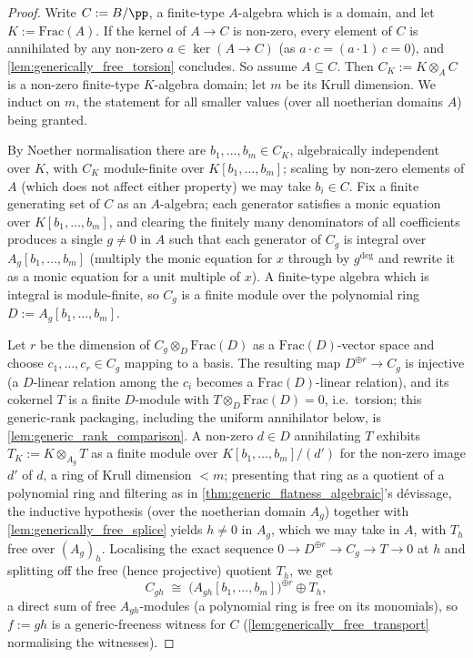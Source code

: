 \begin{proof}
\leanok
  Write \(C := B/\pp\), a finite-type \(A\)-algebra which is a domain, and let
  \(K := \mathrm{Frac}(A)\).  If the kernel of \(A \to C\) is non-zero, every
  element of \(C\) is annihilated by any non-zero \(a \in \ker(A \to C)\)
  (as \(a \cdot c = (a \cdot 1)\, c = 0\)), and
  \cref{lem:generically_free_torsion} concludes.  So assume \(A \subseteq C\).
  Then \(C_K := K \otimes_A C\) is a non-zero finite-type \(K\)-algebra domain;
  let \(m\) be its Krull dimension.  We induct on \(m\), the statement for all
  smaller values (over all noetherian domains \(A\)) being granted.

  By Noether normalisation there are \(b_1, \dots, b_m \in C_K\), algebraically
  independent over \(K\), with \(C_K\) module-finite over
  \(K[b_1, \dots, b_m]\); scaling by non-zero elements of \(A\) (which does not
  affect either property) we may take \(b_i \in C\).  Fix a finite generating
  set of \(C\) as an \(A\)-algebra; each generator satisfies a monic equation
  over \(K[b_1, \dots, b_m]\), and clearing the finitely many denominators of
  all coefficients produces a single \(g \ne 0\) in \(A\) such that each
  generator of \(C_g\) is integral over \(A_g[b_1, \dots, b_m]\) (multiply the
  monic equation for \(x\) through by \(g^{\deg}\) and rewrite it as a monic
  equation for a unit multiple of \(x\)).  A finite-type algebra which is
  integral is module-finite, so \(C_g\) is a finite module over the polynomial
  ring \(D := A_g[b_1, \dots, b_m]\).

  Let \(r\) be the dimension of \(C_g \otimes_D \mathrm{Frac}(D)\) as a
  \(\mathrm{Frac}(D)\)-vector space and choose \(c_1, \dots, c_r \in C_g\)
  mapping to a basis.  The resulting map \(D^{\oplus r} \to C_g\) is injective
  (a \(D\)-linear relation among the \(c_i\) becomes a
  \(\mathrm{Frac}(D)\)-linear relation), and its cokernel \(T\) is a finite
  \(D\)-module with \(T \otimes_D \mathrm{Frac}(D) = 0\), i.e.\ torsion;
  this generic-rank packaging, including the uniform annihilator below, is
  \cref{lem:generic_rank_comparison}.  A
  non-zero \(d \in D\) annihilating \(T\) exhibits
  \(T_K := K \otimes_{A_g} T\) as a finite module over
  \(K[b_1, \dots, b_m]/(d')\) for the non-zero image \(d'\) of \(d\), a ring of
  Krull dimension \(< m\); presenting that ring as a quotient of a polynomial
  ring and filtering as in \cref{thm:generic_flatness_algebraic}'s dévissage,
  the inductive hypothesis (over the noetherian domain \(A_g\)) together with
  \cref{lem:generically_free_splice} yields \(h \ne 0\) in \(A_g\), which we
  may take in \(A\), with \(T_h\) free over \((A_g)_h\).  Localising the exact
  sequence \(0 \to D^{\oplus r} \to C_g \to T \to 0\) at \(h\) and splitting
  off the free (hence projective) quotient \(T_h\), we get
  \[
    C_{gh} \;\cong\; \bigl(A_{gh}[b_1, \dots, b_m]\bigr)^{\oplus r} \oplus T_h ,
  \]
  a direct sum of free \(A_{gh}\)-modules (a polynomial ring is free on its
  monomials), so \(f := gh\) is a generic-freeness witness for \(C\)
  (\cref{lem:generically_free_transport} normalising the witnesses).
\end{proof}

